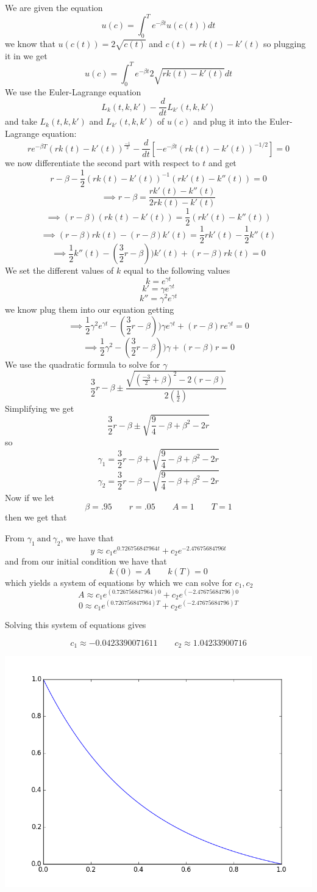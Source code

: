 \documentclass[letterpaper,12pt]{article}
\theoremstyle{definition}
\begin{document}
We are given the equation
\[u(c)=\int_0^T e^{-\beta t}u(c(t))dt\]
we know that $u(c(t))=2\sqrt{c(t)}$ and $c(t)=rk(t)-k'(t)$ so plugging it in we get
\[u(c)=\int_0^T e^{-\beta t}2\sqrt{rk(t)-k'(t)}dt\]
We use the Euler-Lagrange equation
\[L_k(t,k,k')-\frac{d}{dt}L_{k'}(t,k,k')\]
and take $L_k(t,k,k')$ and $L_{k'}(t,k,k')$ of $u(c)$ and plug it into the Euler-Lagrange equation:
\[re^{-\beta T}\left(rk(t)-k'(t)\right)^{\frac{-1}{2}}-\frac{d}{dt}\left[-e^{-\beta t}\left(rk(t)-k'(t)\right)^{-1/2}\right]=0\]
we now differentiate the second part with respect to $t$ and get
\[r-\beta - \frac{1}{2}\left(rk(t)-k'(t)\right)^{-1}\left(rk'(t)-k''(t)\right)=0\]
\[\implies r-\beta=\frac{rk'(t)-k''(t)}{2rk(t)-k'(t)}\]
\[\implies (r-\beta)(rk(t)-k'(t))=\frac{1}{2}(rk'(t)-k''(t))\]
\[\implies (r- \beta)rk(t)-(r-\beta)k'(t)=\frac{1}{2}rk'(t)-\frac{1}{2}k''(t)\]
\[\implies \frac{1}{2}k''(t)-(\frac{3}{2}r-\beta))k'(t)+(r-\beta)rk(t)=0\]
We set the different values of $k$ equal to the following values
\[k=e^{\gamma t}\]
\[k'=\gamma e^{\gamma t}\]
\[k''=\gamma^2 e^{\gamma t}\]
we know plug them into our equation getting
\[\implies \frac{1}{2}\gamma^2 e^{\gamma t}-(\frac{3}{2}r-\beta))\gamma e^{\gamma t}+(r-\beta)re^{\gamma t}=0\]
\[\implies \frac{1}{2}\gamma^2 -(\frac{3}{2}r-\beta))\gamma +(r-\beta)r=0\]
We use the quadratic formula to solve for $\gamma$
\[\frac{3}{2}r-\beta \pm \frac{\sqrt{(\frac{-3}{2}+\beta)^2-2(r-\beta)}}{2(\frac{1}{2})}\]
Simplifying we get
\[\frac{3}{2}r-\beta \pm \sqrt{\frac{9}{4}-\beta +\beta^2 - 2r}\]
so 
\[\gamma_1=\frac{3}{2}r-\beta +\sqrt{\frac{9}{4}-\beta +\beta^2 - 2r}\]
\[\gamma_2=\frac{3}{2}r-\beta -\sqrt{\frac{9}{4}-\beta +\beta^2 - 2r}\]
Now if we let \[\beta = .95 \qquad r = .05 \qquad A = 1 \qquad T = 1 \]
then we get that 



From $\gamma_1 ~ \text{and} ~ \gamma_2$, we have that 
\[y \approx c_1e^{0.726756847964 t} + c_2e^{-2.47675684796 t}\] 
and from our initial condition we have that \[k(0) = A \qquad k(T) = 0\]
which yields a system of equations by which we can solve for $c_1, c_2$
\[
A \approx c_1e^{(0.726756847964) 0} + c_2e^{(-2.47675684796) 0}
\]
\[
0 \approx c_1e^{(0.726756847964) T} + c_2e^{(-2.47675684796) T}
\]

Solving this system of equations gives 

\[ 
c_1 \approx -0.0423390071611 \qquad
c_2 \approx 1.04233900716
\]


\includegraphics[scale = .75]{problem922}
\end{document}
